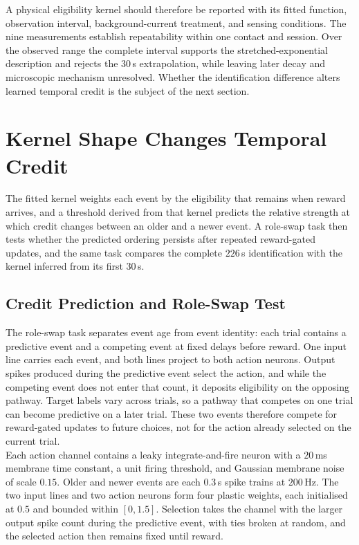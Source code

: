 \noindent A physical eligibility kernel should therefore be reported with its fitted function, observation interval,
background-current treatment, and sensing conditions. The nine measurements establish repeatability within one contact
and session. Over the observed range the complete interval supports the stretched-exponential description and rejects
the $30$\,s extrapolation, while leaving later decay and microscopic mechanism unresolved. Whether the identification
difference alters learned temporal credit is the subject of the next section.

\FloatBarrier

\section[Kernel Shape Changes Temporal Credit]{Kernel Shape Changes Temporal Credit}
\label{sec:7p2}

\noindent The fitted kernel weights each event by the eligibility that remains when reward arrives, and a threshold
derived from that kernel predicts the relative strength at which credit changes between an older and a newer event. A
role-swap task then tests whether the predicted ordering persists after repeated reward-gated updates, and the same task
compares the complete $226$\,s identification with the kernel inferred from its first $30$\,s.

\subsection[Credit Prediction and Role-Swap Test]{Credit Prediction and Role-Swap Test}
\label{sec:7p2p1}

\noindent The role-swap task separates event age from event identity: each trial contains a predictive event and a
competing event at fixed delays before reward. One input line carries each event, and both lines project to both action
neurons. Output spikes produced during the predictive event select the action, and while the competing event does not
enter that count, it deposits eligibility on the opposing pathway. Target labels vary across trials, so a pathway that
competes on one trial can become predictive on a later trial. These two events therefore compete for reward-gated updates
to future choices, not for the action already selected on the current trial.\\

\noindent Each action channel contains a leaky integrate-and-fire neuron with a $20$\,ms membrane time constant, a unit
firing threshold, and Gaussian membrane noise of scale $0.15$. Older and newer events are each $0.3$\,s spike trains
at $200$\,Hz. The two input lines and two action neurons form four plastic weights, each initialised at $0.5$ and
bounded within $[0,1.5]$. Selection takes the channel with the larger output spike count during the predictive event,
with ties broken at random, and the selected action then remains fixed until reward.\\

